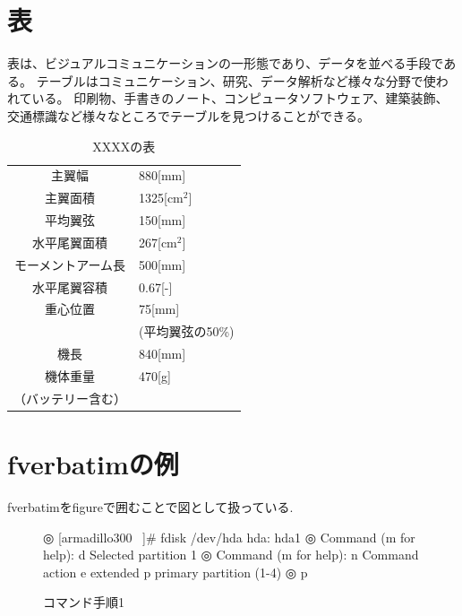 \section{表}
表は、ビジュアルコミュニケーションの一形態であり、データを並べる手段である。
テーブルはコミュニケーション、研究、データ解析など様々な分野で使われている。
印刷物、手書きのノート、コンピュータソフトウェア、建築装飾、交通標識など様々なところでテーブルを見つけることができる。
\begin{table}[htbp]
\caption{XXXXの表}
\begin{center}
\begin{tabular}{|cl|}
\hline
主翼幅 & 880[mm] \\
主翼面積 & 1325[cm$^2$] \\
平均翼弦& 150[mm] \\
水平尾翼面積 & 267[cm$^2$] \\
モーメントアーム長 & 500[mm] \\
水平尾翼容積 & 0.67[-] \\
重心位置 & 75[mm] \\
         & (平均翼弦の50\%) \\
機長 & 840[mm] \\
機体重量 & 470[g] \\
（バッテリー含む） &  \\
\hline
\end{tabular}
\end{center}
\end{table}

\newpage

\section{fverbatimの例}
fverbatimをfigureで囲むことで図として扱っている.

\begin{figure}[htbp]
\begin{fverbatim}{1.1\linewidth}
◎ [armadillo300 ~]# fdisk /dev/hda
hda: hda1
◎ Command (m for help): d
Selected partition 1
◎ Command (m for help): n
Command action
   e extended
   p primary partition (1-4)
◎ p
\end{fverbatim}
\caption{コマンド手順1}
\label{ラベル名}
\end{figure}
